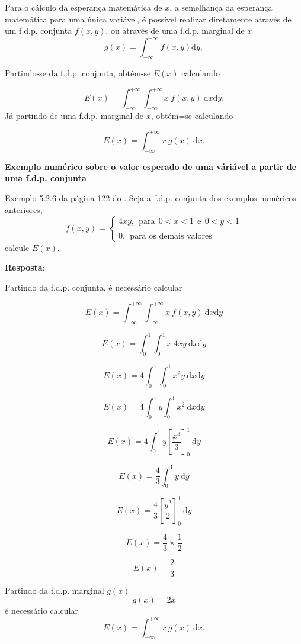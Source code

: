 \documentclass[
]{book}
\begin{document}
Para o cálculo da esperança matemática de \(x\), a semelhança da esperança matemática para uma única variável, é possível realizar diretamente através de um f.d.p. conjunta \(f(x,y)\), ou através de uma f.d.p. marginal de \(x\)
\[
  g(x) = \int_{-\infty}^{+\infty} f(x,y) \text{d}y,
\]

Partindo-se da f.d.p. conjunta, obtém-se \(E(x)\) calculando

\[
  E(x) = \int_{-\infty}^{+\infty} \int_{-\infty}^{+\infty} x~f(x,y)~\text{d}x\text{d}y.
\]
Já partindo de uma f.d.p. marginal de \(x\), obtém=se calculando

\[
  E(x) = \int_{-\infty}^{+\infty} x~g(x)~\text{d}x.
\]

\textbf{Exemplo numérico sobre o valor esperado de uma váriável a partir de uma f.d.p. conjunta}

Exemplo 5.2.6 da página 122 do \citet{Sartoris2013}. Seja a f.d.p. conjunta dos exemplos numéricos anteriores,
\begin{equation}
  f(x,y) = 
    \begin{cases}
      4xy,~~\text{para}~~0 < x < 1~~\text{e}~~0 < y < 1 \\
      \\
      0, ~~\text{para os demais valores}
    \end{cases}
\end{equation}
calcule \(E(x)\).

\textbf{Resposta}:

Partindo da f.d.p. conjunta, é necessário calcular

\[
  E(x) = \int_{-\infty}^{+\infty} \int_{-\infty}^{+\infty} x~f(x,y)~\text{d}x\text{d}y
\]

\[
  E(x) = \int_{0}^{1} \int_{0}^{1} x~4xy~\text{d}x\text{d}y
\]

\[
  E(x) = 4\int_{0}^{1} \int_{0}^{1} x^2y~\text{d}x\text{d}y
\]

\[
  E(x) = 4\int_{0}^{1}y \int_{0}^{1} x^2~\text{d}x\text{d}y
\]

\[
  E(x) = 4\int_{0}^{1}y \left[ \dfrac{x^3}{3} \right]_{0}^{1}~\text{d}y
\]

\[
  E(x) = \dfrac{4}{3}\int_{0}^{1}y~\text{d}y
\]

\[
  E(x) = \dfrac{4}{3}\left[ \dfrac{y^2}{2} \right]_{0}^{1}~\text{d}y
\]

\[
  E(x) = \dfrac{4}{3}\times \dfrac{1}{2}
\]

\[
  E(x) = \dfrac{2}{3}
\]

Partindo da f.d.p. marginal \(g(x)\)
\[
  g(x) = 2x
\]
é necessário calcular
\[
  E(x) = \int_{-\infty}^{+\infty} x~g(x)~\text{d}x.
\]
\end{document}
